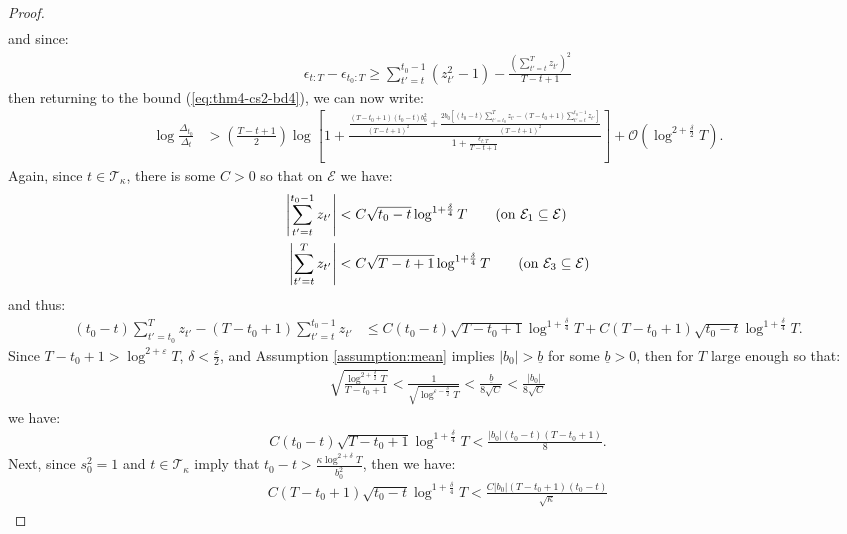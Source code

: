 \begin{proof}
\begin{align*}
\end{align*}
and since:
\begin{align*}
    \epsilon_{t:T} - \epsilon_{t_0:T} \geq \sum_{t' = t}^{t_0 - 1} (z_{t'}^2-1) - \frac{\left(\sum_{t'=t}^T z_{t'}\right)^2}{T-t+1}
\end{align*}
then returning to the bound (\ref{eq:thm4-cs2-bd4}), we can now write:
\begin{align}
    \log \frac{\Delta_{t_0}}{\Delta_t} &> \left(\frac{T - t +1}{2}\right)\log\left[1 +\frac{\frac{(T-t_0+1)(t_0-t)b_0^2}{(T-t+1)^2} + \frac{2b_0\left[(t_0-t)\sum_{t'=t_0}^{T} z_{t'} - (T-t_0+1)\sum_{t'=t}^{t_0-1} z_{t'}\right]}{(T-t+1)^2}}{1 + \frac{\epsilon_{t:T}}{T-t+1}} \right] + \mathcal{O}\left(\log^{2+\frac{\delta}{2}} T\right). \label{eq:thm4-cs2-bd5}
\end{align}
Again, since $t\in\mathcal{T}_\kappa$, there is some $C>0$ so that on $\mathcal{E}$ we have:
\begin{align*}
    \left|\sum_{t'=t}^{t_0-1} z_{t'}\right| &< C\sqrt{t_0-t} \log^{1+\frac{\delta}{4}} T\tag{on $\mathcal{E}_1 \subseteq\mathcal{E}$} \\
    \left|\sum_{t'=t}^{T} z_{t'} \right|&< C\sqrt{T-t+1} \log^{1+\frac{\delta}{4}} T \tag{on $\mathcal{E}_3 \subseteq\mathcal{E}$}
\end{align*}
and thus:
\begin{align*}
    (t_0-t)\sum_{t'=t_0}^{T} z_{t'} - (T-t_0+1)\sum_{t'=t}^{t_0-1} z_{t'} &\leq C(t_0-t)\sqrt{T-t_0+1}\log^{1+\frac{\delta}{4}} T + C(T-t_0+1)\sqrt{t_0-t}\log^{1+\frac{\delta}{4}} T.
\end{align*}
Since $T-t_0+1 > \log^{2+\varepsilon} T$, $\delta < \frac{\varepsilon}{2}$, and Assumption \ref{assumption:mean} implies $|b_0| > \underline{b}$ for some $\underline{b} > 0$, then for $T$ large enough so that:
\begin{align*}
    \sqrt{\frac{\log^{2+\frac{\delta}{2}} T}{T-t_0+1}} < \frac{1}{\sqrt{\log^{\varepsilon - \frac{\delta}{2}} T}} < \frac{\underline{b}}{8\sqrt{C}} < \frac{|b_0|}{8 \sqrt{C}}
\end{align*}
we have:
\begin{align*}
    C(t_0-t)\sqrt{T-t_0+1}\log^{1+\frac{\delta}{4}} T < \frac{|b_0|(t_0 - t)(T-t_0+1)}{8}.
\end{align*}
Next, since $s_0^2 = 1$ and $t \in \mathcal{T}_\kappa$ imply that $t_0 - t > \frac{\kappa\log^{2+\delta} T}{b_0^2}$, then we have:
\begin{align*}
    C(T-t_0+1)\sqrt{t_0-t}\log^{1+\frac{\delta}{4}} T < \frac{C|b_0|(T-t_0+1)(t_0 -t)}{\sqrt{\kappa}}

\end{align*}
\end{proof}

